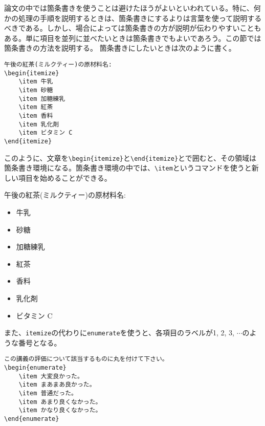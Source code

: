 論文の中では箇条書きを使うことは避けたほうがよいといわれている。特に、何かの処理の手順を説明するときは、箇条書きにするよりは言葉を使って説明するべきである。しかし、場合によっては箇条書きの方が説明が伝わりやすいこともある。単に項目を並列に並べたいときは箇条書きでもよいであろう。この節では箇条書きの方法を説明する。
箇条書きにしたいときは次のように書く。
\begin{reidai}
    \begin{verbatim}
午後の紅茶(ミルクティー)の原材料名:
\begin{itemize}
    \item 牛乳
    \item 砂糖
    \item 加糖練乳
    \item 紅茶
    \item 香料
    \item 乳化剤
    \item ビタミン C
\end{itemize}
\end{verbatim}
\end{reidai} \noindent
このように、文章を\verb|\begin{itemize}|と\verb|\end{itemize}|とで囲むと、その領域は箇条書き環境になる。箇条書き環境の中では、\verb|\item|というコマンドを使うと新しい項目を始めることができる。
\begin{kekka}
    \def\labelitemisave{\labelitemi}
    \def\labelitemi{\(\bullet\)}
    午後の紅茶(ミルクティー)の原材料名:
    \begin{itemize}
        \item 牛乳
        \item 砂糖
        \item 加糖練乳
        \item 紅茶
        \item 香料
        \item 乳化剤
        \item ビタミン C
    \end{itemize}
    \def\labelitemi{\labelitemisave}
\end{kekka} \noindent
また、\texttt{itemize}の代わりに\texttt{enumerate}を使うと、各項目のラベルが1, 2, 3, \(\cdots\)のような番号となる。
\begin{reidai}
    \begin{verbatim}
この講義の評価について該当するものに丸を付けて下さい。
\begin{enumerate}
    \item 大変良かった。
    \item まあまあ良かった。
    \item 普通だった。
    \item あまり良くなかった。
    \item かなり良くなかった。
\end{enumerate}
\end{verbatim}
\end{reidai}
